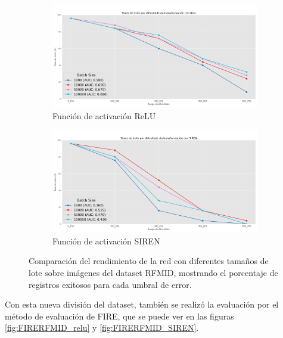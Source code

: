 \begin{figure}[tbp]
    \centering
    \begin{subfigure}[b]{0.5\textwidth}
        \centering
        \includegraphics[width=\textwidth]{imaxes/batchsize/experiment_plot_RFMID_bs_relu.png}
        \caption{Función de activación ReLU}
        \label{fig:batch_size_comparison_relu_rfmid}
    \end{subfigure}\hfill
    \begin{subfigure}[b]{0.5\textwidth}
        \centering
        \includegraphics[width=\textwidth]{imaxes/batchsize/experiment_plot_RFMID_bs_siren.png}
        \caption{Función de activación SIREN}
        \label{fig:batch_size_comparison_siren_rfmid}
    \end{subfigure}
    \caption{Comparación del rendimiento de la red con diferentes tamaños de lote sobre imágenes del dataset RFMID, mostrando el porcentaje de registros exitosos para cada umbral de error.}
    \label{fig:batch_size_comparisons_rfmid}
\end{figure}

Con esta nueva división del dataset, también se realizó la evaluación por el método de evaluación de FIRE, que se puede ver en las figuras \ref{fig:FIRERFMID_relu} y \ref{fig:FIRERFMID_SIREN}.

